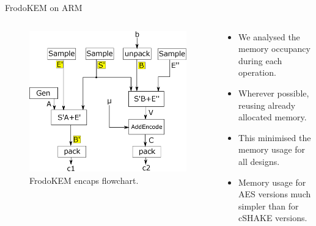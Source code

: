 \documentclass{beamer}            %
\begin{document}
\begin{frame}{FrodoKEM on ARM}

\begin{columns}
\hspace{.5cm}
	\begin{column}{0.45\textwidth}
		\begin{figure}
		\includegraphics[scale=0.33]{frodo_flowchart_encaps}
		\caption{FrodoKEM encaps flowchart.}
		\end{figure}
    \end{column}
    \begin{column}{0.55\textwidth}
    \hspace{-3.5cm}
		\begin{itemize}
		\item We analysed the memory occupancy during each operation.
		\item Wherever possible, reusing already allocated memory. 
		\item This minimised the memory usage for all designs.		
		\item Memory usage for AES versions much simpler than for cSHAKE versions.
		\end{itemize}
    \end{column}
\end{columns}

\end{frame}

\end{document}
